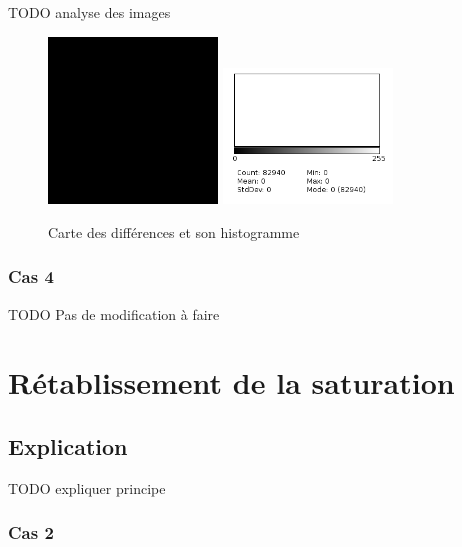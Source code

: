 \documentclass[a4paper]{article}
\begin{document}
TODO analyse des images

\begin{figure}[H]
\begin{center}
\includegraphics[width=170px]{../resultats/e1_q2_k3_diff.png}
\includegraphics[width=170px]{../resultats/e1_q2_k3_diff_hist.png}
\end{center}
\caption{Carte des différences et son histogramme}
\end{figure}

\clearpage
\subsubsection{Cas 4}

TODO Pas de modification à faire


\clearpage

\section{Rétablissement de la saturation}

\subsection{Explication}

TODO expliquer principe

\subsubsection{Cas 2}
\end{document}
